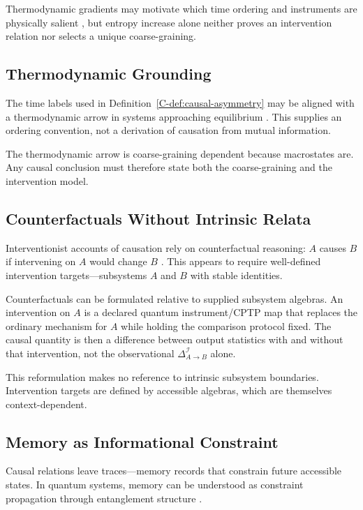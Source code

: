 \documentclass[12pt,a4paper,openany]{book}
\begin{document}
Thermodynamic gradients may motivate which time ordering and instruments are physically salient \cite{Wallace2012Time}, but entropy increase alone neither proves an intervention relation nor selects a unique coarse-graining.

\subsection{Thermodynamic Grounding}
\label{C-sec:I.3}

The time labels used in Definition~\ref{C-def:causal-asymmetry} may be aligned with a thermodynamic arrow in systems approaching equilibrium \cite{Wallace2012Time}.  This supplies an ordering convention, not a derivation of causation from mutual information.

The thermodynamic arrow is coarse-graining dependent because macrostates are.  Any causal conclusion must therefore state both the coarse-graining and the intervention model.

\subsection{Counterfactuals Without Intrinsic Relata}
\label{C-sec:I.4}

Interventionist accounts of causation rely on counterfactual reasoning: $A$ causes $B$ if intervening on $A$ would change $B$ \cite{Woodward2003}. This appears to require well-defined intervention targets—subsystems $A$ and $B$ with stable identities.

Counterfactuals can be formulated relative to supplied subsystem algebras.  An intervention on $A$ is a declared quantum instrument/CPTP map that replaces the ordinary mechanism for $A$ while holding the comparison protocol fixed.  The causal quantity is then a difference between output statistics with and without that intervention, not the observational $\Delta_{A\to B}^{\mathcal I}$ alone.

This reformulation makes no reference to intrinsic subsystem boundaries. Intervention targets are defined by accessible algebras, which are themselves context-dependent.

\subsection{Memory as Informational Constraint}
\label{C-sec:I.5}

Causal relations leave traces—memory records that constrain future accessible states. In quantum systems, memory can be understood as constraint propagation through entanglement structure \cite{Hayden2007}.
\end{document}
